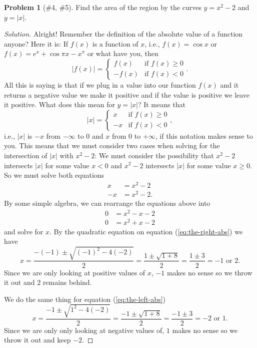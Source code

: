 \documentclass{article}
\theoremstyle{plain}
\theoremstyle{definition}
\newtheorem{problem}[exercise]{Problem}
\theoremstyle{remark}
\begin{document}
\begin{problem}[{\color{Green}\#4}, {\color{Red}\#5}]
Find the area of the region by the curves $y=x^2-2$ and $y=|x|$.
\end{problem}
\begin{proof}[Solution]
Alright! Remember the definition of the absolute value of a function
anyone? Here it is: If $f(x)$ is a function of $x$, i.e., $f(x)=\cos x$ or
$f(x)=e^x+\cos\pi x-x^{\pi}$ or what have you, then
\begin{equation}
  \label{eq:absolute-value}
\left|f(x)\right|=
\begin{cases}
f(x)&\text{if $f(x)\geq 0$}\\
-f(x)&\text{if $f(x)<0$}
\end{cases}.
\end{equation}
All this is saying is that if we plug in a value into our function $f(x)$
and it returns a negative value we make it positive and if the value is
positive we leave it positive. What does this mean for $y=|x|$? It means
that
\[
|x|=\begin{cases}
x&\text{if $f(x)\geq 0$}\\
-x&\text{if $f(x)<0$}
\end{cases},
\]
i.e., $|x|$ is $-x$ from $-\infty$ to $0$ and $x$ from $0$ to $+\infty$,
if this notation makes sense to you. This means that we must consider two
cases when solving for the intersection of $|x|$ with $x^2-2$: We must
consider the possibility that $x^2-2$ intersects $|x|$ for some value $x<0$
and $x^2-2$ intersects $|x|$ for some value $x\geq 0$. So we must solve
both equations
\begingroup
\allowdisplaybreaks
\begin{align*}
x&=x^2-2\\
-x&=x^2-2.
\end{align*}
\endgroup
By some simple algebra, we can rearrange the equations above into
\begingroup
\allowdisplaybreaks
\begin{align}
\label{eq:the-right-abs}
0&=x^2-x-2\\
\label{eq:the-left-abs}
0&=x^2+x-2
\end{align}
\endgroup
and solve for $x$. By the quadratic equation on equation
(\ref{eq:the-right-abs}) we have
\[
x=\frac{-(-1)\pm\sqrt{(-1)^2-4(-2)}}{2}=\frac{1\pm\sqrt{1+8}}{2}=\frac{1\pm
3}{2}=\text{$-1$ or $2$.}
\]
Since we are only looking at positive values of $x$, $-1$ makes no sense
so we throw it out and $2$ remains behind.

We do the same thing for equation (\ref{eq:the-left-abs})
\[
x=\frac{-1\pm\sqrt{1^2-4(-2)}}{2}=\frac{-1\pm\sqrt{1+8}}{2}=\frac{-1\pm
3}{2}=\text{$-2$ or $1$.}
\]
Since we are only only looking at negative values of, $1$ makes no sense so
we throw it out and keep $-2$.


\end{proof}
\end{document}
